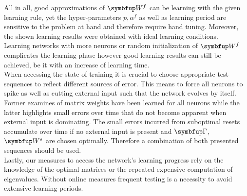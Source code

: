 All in all, good approximations of $\bmu{W}^f$ can be learning with the given learning rule, yet the hyper-parameters $p,\alpha^f$ as well as learning period are sensitive to the problem at hand and therefore require hand tuning. Moreover, the shown learning results were obtained with ideal learning conditions.\\
Learning networks with more neurons or random initialization of $\bmu{W}^f$ complicates the learning phase however good learning results can still be achieved, be it with an increase of learning time.\\
When accessing the state of training it is crucial to choose appropriate test sequences to reflect different sources of error. This means to force all neurons to spike as well as cutting external input such that the network evolves by itself. Former examines of matrix weights have been learned for all neurons while the latter highlights small errors over time that do not become apparent when external input is dominating. The small errors incurred from suboptimal resets accumulate over time if no external input is present and $\bmu{\Gamma} $, $\bmu{W}^s$ are chosen optimally. Therefore a combination of both presented sequences should be used.\\
Lastly, our measures to access the network's learning progress rely on the knowledge of the optimal matrices or the repeated expensive computation of eigenvalues. Without online measures frequent testing is a necessity to avoid extensive learning periods.\\
